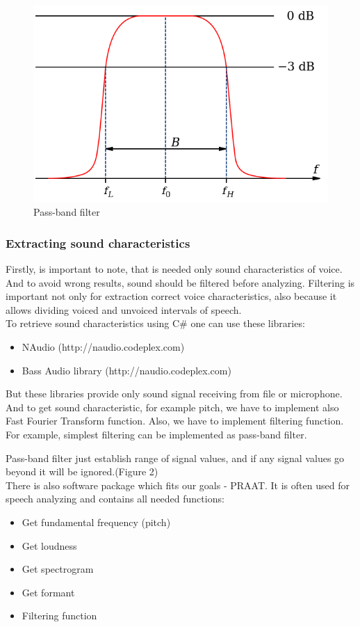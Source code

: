 \documentclass[14pt]{extarticle}
\begin{document}
\begin{figure}
	\centering
		\includegraphics[scale=0.7]{images/pass-band-filter.png}
	\caption{Pass-band filter}
	\label{fig:pass-band-filter}
\end{figure}

\subsubsection{Extracting sound characteristics}

Firstly, is important to note, that is needed only sound characteristics of voice. And to avoid wrong results, sound should be filtered before analyzing. Filtering is important not only for extraction correct voice characteristics, also because it allows dividing voiced and unvoiced intervals of speech.
\\

To retrieve sound characteristics using C\# one can use these libraries:
\begin{itemize}
	\item NAudio (http://naudio.codeplex.com)
	\item Bass Audio library (http://naudio.codeplex.com)
\end{itemize}

But these libraries provide only sound signal receiving from file or microphone. And to get sound characteristic, for example pitch, we have to implement also Fast Fourier Transform function. Also, we have to implement filtering function. For example, simplest filtering can be implemented as pass-band filter. 

Pass-band filter just establish range of signal values, and if any signal values go beyond it will be ignored.(Figure 2)
\\
There is also software package which fits our goals - PRAAT\cite{praat}. It is often used for speech analyzing and contains all needed functions:
\begin{itemize}
	\item Get fundamental frequency (pitch)
	\item Get loudness
	\item Get spectrogram
	\item Get formant
	\item Filtering function
\end{itemize}
\end{document}
